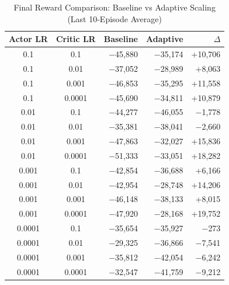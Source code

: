 \begin{table}[htbp]
\caption{Final Reward Comparison: Baseline vs Adaptive Scaling (Last 10-Episode Average)}
\label{tab:adaptive_rewards}
\centering
\small
\begin{tabular}{ccrrr}
\toprule
\textbf{Actor LR} & \textbf{Critic LR} & \textbf{Baseline} & \textbf{Adaptive} & \textbf{$\Delta$} \\
\midrule
0.1 & 0.1 & $-$45,880 & $-$35,174 & +10,706 \\
0.1 & 0.01 & $-$37,052 & $-$28,989 & +8,063 \\
0.1 & 0.001 & $-$46,853 & $-$35,295 & +11,558 \\
0.1 & 0.0001 & $-$45,690 & $-$34,811 & +10,879 \\
0.01 & 0.1 & $-$44,277 & $-$46,055 & $-$1,778 \\
0.01 & 0.01 & $-$35,381 & $-$38,041 & $-$2,660 \\
0.01 & 0.001 & $-$47,863 & $-$32,027 & +15,836 \\
0.01 & 0.0001 & $-$51,333 & $-$33,051 & +18,282 \\
0.001 & 0.1 & $-$42,854 & $-$36,688 & +6,166 \\
0.001 & 0.01 & $-$42,954 & $-$28,748 & +14,206 \\
0.001 & 0.001 & $-$46,148 & $-$38,133 & +8,015 \\
0.001 & 0.0001 & $-$47,920 & $-$28,168 & +19,752 \\
0.0001 & 0.1 & $-$35,654 & $-$35,927 & $-$273 \\
0.0001 & 0.01 & $-$29,325 & $-$36,866 & $-$7,541 \\
0.0001 & 0.001 & $-$35,812 & $-$42,054 & $-$6,242 \\
0.0001 & 0.0001 & $-$32,547 & $-$41,759 & $-$9,212 \\
\bottomrule
\end{tabular}
\end{table}

